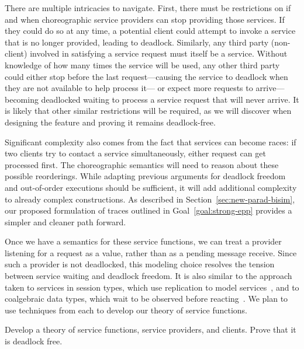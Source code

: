 There are multiple intricacies to navigate.
First, there must be restrictions on if and when choreographic service providers can stop providing those services.
If they could do so at any time, a potential client could attempt to invoke a service that is no longer provided, leading to deadlock.
Similarly, any third party (non-client) involved in satisfying a service request must itself be a service.
Without knowledge of how many times the service will be used,
any other third party could either stop before the last request---causing the service to deadlock when they are not available to help process it---%
or expect more requests to arrive---becoming deadlocked waiting to process a service request that will never arrive.
It is likely that other similar restrictions will be required, as we will discover when designing the feature and proving it remains deadlock-free.

Significant complexity also comes from the fact that services can become races:
if two clients try to contact a service simultaneously, either request can get processed first.
The choreographic semantics will need to reason about these possible reorderings.
While adapting previous arguments for deadlock freedom and out-of-order executions should be sufficient,
it will add additional complexity to already complex constructions.
As described in Section~\ref{sec:new-parad-bisim}, our proposed formulation of traces outlined in Goal~\ref{goal:strong-epp}
provides a simpler and cleaner path forward.

Once we have a semantics for these service functions, we can treat a provider listening for a request as a value, rather than as a pending message receive.
Since such a provider is not deadlocked, this modeling choice resolves the tension between service waiting and deadlock freedom.
It is also similar to the approach taken to services in session types, which use replication to model services~\cite{DeYoungCPT09,CairesP10,Wadler12,LeBrunFD25},
and to coalgebraic data types, which wait to be observed before reacting~\cite{KozenS17}.
We plan to use techniques from each to develop our theory of service functions.

\begin{goal}
  \label{goal:wait-until-called}
  Develop a theory of service functions, service providers, and clients.
  Prove that it is deadlock free.
\end{goal}


\iffalse
{}

